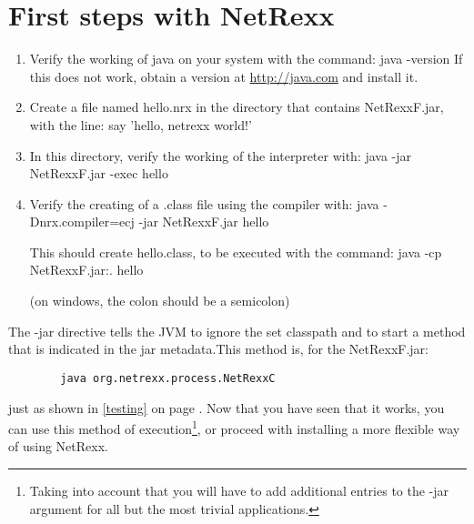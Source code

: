 \section{First steps with NetRexx}
\begin{enumerate}
\item Verify the working of java on your system with the command:
	java -version\newline
If this does not work, obtain a version at \url{http://java.com} and install it.

\item Create a file named hello.nrx in the directory that contains NetRexxF.jar, with the line:
	say 'hello, netrexx world!'

\item In this directory, verify the working of the interpreter with:
	java -jar NetRexxF.jar -exec hello

\item Verify the creating of a .class file using the compiler with:
	java -Dnrx.compiler=ecj -jar NetRexxF.jar hello

This should create hello.class, to be executed with the command:
	java -cp NetRexxF.jar:. hello

(on windows, the colon should be a semicolon)
\end{enumerate}
The -jar directive tells the JVM to ignore the set classpath and to
start a method that is indicated in the jar metadata.This method is,
for the NetRexxF.jar: 
 \begin{verbatim}
        java org.netrexx.process.NetRexxC
\end{verbatim}
just as shown in \ref{testing} on page \pageref{testing}. Now that you
have seen that it works, you can use this method of
execution\footnote{Taking into account that you will have to add
  additional entries to the -jar argument for all but the most trivial
applications.}, or
proceed with installing a more flexible way of using NetRexx.

